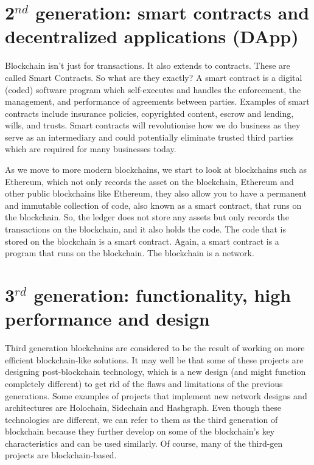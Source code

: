 \section{\texorpdfstring{2$^{nd}$ generation: smart contracts and decentralized applications (DApp)}{2nd generation: smart contracts and decentralized applications (DApp)}}
Blockchain isn't just for transactions. It also extends to contracts. These are called Smart Contracts. So what are they exactly? A smart contract is a digital (coded) software program which self-executes and handles the enforcement, the management, and performance of agreements between parties. Examples of smart contracts include insurance policies, copyrighted content, escrow and lending, wills, and trusts. Smart contracts will revolutionise how we do business as they serve as an intermediary and could potentially eliminate trusted third parties which are required for many businesses today. 
 
As we move to more modern blockchains, we start to look at blockchains such as Ethereum, which not only records the asset on the blockchain,
Ethereum and other public blockchains like Ethereum, they also allow you to have a permanent and immutable collection of code, also known as a smart contract, that runs on the blockchain.
So, the ledger does not store any assets but only records the transactions on the blockchain, and it also holds the code. The code that is stored on the blockchain is a smart contract. Again, a smart contract is a program that runs on the blockchain. The blockchain is a network.

\section{\texorpdfstring{3$^{rd}$ generation: functionality, high performance and design}{3rd generation: functionality, high performance and design}}

Third generation blockchains are considered to be the result of working on more efficient blockchain-like solutions. It may well be that some of these projects are designing post-blockchain technology, which is a new design (and might function completely different) to get rid of the flaws and limitations of the previous generations. Some examples of projects that implement new network designs and architectures are Holochain, Sidechain and Hashgraph. Even though these technologies are different, we can refer to them as the third generation of blockchain because they further develop on some of the blockchain's key characteristics and can be used similarly. Of course, many of the third-gen projects are blockchain-based.\medskip

